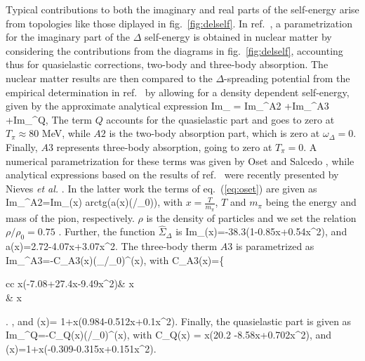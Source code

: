 Typical contributions
to both the imaginary and real parts of the self-energy arise
from topologies like those diplayed in fig.\ \ref{fig:delself}.
In ref.\ \cite{os87}, a parametrization for the imaginary part of the
$\Delta$ self-energy is obtained in nuclear matter by considering the
contributions from the diagrams  in fig.\ \ref{fig:delself}, accounting
thus for quasielastic corrections, two-body and three-body
absorption. The nuclear matter results are then compared to the
$\Delta$-spreading potential from the empirical determination in
ref.\ \cite{hirata80} by allowing for a density dependent self-energy,
given by the approximate analytical expression
\be
Im\Sigma_{\Delta} =
Im\Sigma_{\Delta}^{A2} +Im\Sigma_{\Delta}^{A3} +Im\Sigma_{\Delta}^{Q}, 
\label{eq:oset}
\ee
The term ${Q}$ accounts for the quasielastic part and goes to zero at
$T_{\pi}\approx 80$ MeV, while ${A2}$ is the 
two-body absorption part, which is zero at $\omega_{\Delta} =0$. Finally, 
${A3}$ represents three-body absorption, going to zero at $T_{\pi}=0$. 
A numerical parametrization for these terms was given by Oset and Salcedo
\cite{os87}, while analytical expressions based on the results of ref.\
\cite{os87} were recently presented by Nieves {\em et al.} \cite{nieves93}. 
In the latter work the terms of eq.\ (\ref{eq:oset}) are given as
\be
Im\Sigma_{\Delta}^{A2}=Im\hat{\Sigma}_{\Delta}(x)
arctg\left(a(x)(\rho/\rho_0)\right),
\ee
with $x=\frac{T}{m_{\pi}}$, $T$ and $m_{\pi}$ being the energy and
mass of the pion, respectively. $\rho$ is the density of particles and
we set the relation $\rho/\rho_0=0.75$ \cite{os87}. Further, the function 
$\hat{\Sigma}_{\Delta}$  is 
\be 
Im\hat{\Sigma}_{\Delta}(x)=-38.3\left(1-0.85x+0.54x^2\right),
\ee
and
\be
a(x)=2.72-4.07x+3.07x^2.
\ee
The three-body therm $A3$ is parametrized as
\be
Im\Sigma_{\Delta}^{A3}=-C_{A3}(x)\left(\rho_/\rho_0\right)^{\alpha (x)},
\ee
with 
\be
C_{A3}(x)=\left\{
\begin{array}{cc} x\left(-7.08+27.4x-9.49x^2\right)& x\\
                  \frac{3.7xm_{\pi}}{85}
              & x \end{array}\right. ,
\ee
and
\be
\alpha (x)= 1+x\left(0.984-0.512x+0.1x^2\right).
\ee
Finally, the quasielastic part is given as
\be
Im\Sigma_{\Delta}^{Q}=-C_{Q}(x)\left(\rho/\rho_0\right)^{\beta (x)},
\ee
with
\be
C_{Q}(x) = x\left(20.2 -8.58x+0.702x^2\right),
\ee
and
\be
\beta (x)=1+x\left(-0.309-0.315x+0.151x^2\right).
\ee



